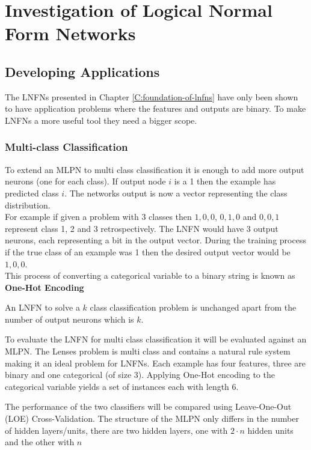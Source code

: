 \chapter{Investigation of Logical Normal Form Networks} \label{C:investigation-of-lnfns}
\section{Developing Applications} \label{sec:developing-applications}
The LNFNs presented in Chapter \ref{C:foundation-of-lnfns} have only been shown to have application problems where the features and outputs are binary. To make LNFNs a more useful tool they need a bigger scope. 

\subsection{Multi-class Classification}
To extend an MLPN to multi class classification it is enough to add more output neurons (one for each class). If output node $i$ is a 1 then the example has predicted class $i$. The networks output is now a vector representing the class distribution. \\

For example if given a problem with 3 classes then ${1,0,0}$, ${0,1,0}$ and ${0,0,1}$ represent class 1, 2 and 3 retrospectively. The LNFN would have 3 output neurons, each representing a bit in the output vector. During the training process if the true class of an example was 1 then the desired output vector would be ${1,0,0}$.\\

This process of converting a categorical variable to a binary string is known as \textbf{One-Hot Encoding}

\begin{definition}
	An LNFN to solve a $k$ class classification problem is unchanged apart from the number of output neurons which is $k$.
\end{definition}

To evaluate the LNFN for multi class classification it will be evaluated against an MLPN. The Lenses problem \cite{Lichman:2013} is multi class and contains a natural rule system making it an ideal problem for LNFNs. Each example has four features, three are binary and one categorical (of size 3). Applying One-Hot encoding to the categorical variable yields a set of instances each with length 6.


The performance of the two classifiers will be compared using Leave-One-Out (LOE) Cross-Validation. The structure of the MLPN only differs in the number of hidden layers/units, there are two hidden layers, one with $2 \cdot n$ hidden units and the other with $n$

